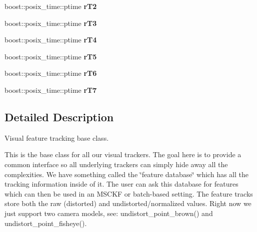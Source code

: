 \begin{DoxyCompactItemize}
boost\+::posix\+\_\+time\+::ptime {\bfseries r\+T2}
\item 
\mbox{\label{classov__core_1_1TrackBase_a8e120e3fea132cc8284216f5567938f3}} 
boost\+::posix\+\_\+time\+::ptime {\bfseries r\+T3}
\item 
\mbox{\label{classov__core_1_1TrackBase_a77d86ae2f9d21a3033c15f99b0e34d6e}} 
boost\+::posix\+\_\+time\+::ptime {\bfseries r\+T4}
\item 
\mbox{\label{classov__core_1_1TrackBase_ab57d642985cdbf063dabbd17a2d2e41e}} 
boost\+::posix\+\_\+time\+::ptime {\bfseries r\+T5}
\item 
\mbox{\label{classov__core_1_1TrackBase_acfc1e6bd97b51b95ac4b2283201f395a}} 
boost\+::posix\+\_\+time\+::ptime {\bfseries r\+T6}
\item 
\mbox{\label{classov__core_1_1TrackBase_a03326b3c79412f3f96d4c0a6d9de1e76}} 
boost\+::posix\+\_\+time\+::ptime {\bfseries r\+T7}
\end{DoxyCompactItemize}


\subsection{Detailed Description}
Visual feature tracking base class. 

This is the base class for all our visual trackers. The goal here is to provide a common interface so all underlying trackers can simply hide away all the complexities. We have something called the \char`\"{}feature database\char`\"{} which has all the tracking information inside of it. The user can ask this database for features which can then be used in an M\+S\+C\+KF or batch-\/based setting. The feature tracks store both the raw (distorted) and undistorted/normalized values. Right now we just support two camera models, see\+: undistort\+\_\+point\+\_\+brown() and undistort\+\_\+point\+\_\+fisheye().



